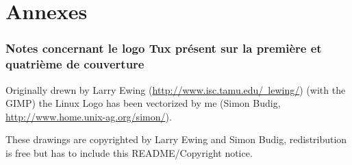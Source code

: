 \documentclass[pdftex,a4paper,titlepage,11pt]{article}
\newcommand{\lastPage}{
	\newpage
	\strut
	\fancyhf{}
	\renewcommand{\headrulewidth}{0pt}
	\addtocounter{page}{-1}
	\AddToShipoutPicture*{\BackgroundPic{Tux_n&b_half_1.png}}
	\newpage
}
\newcommand\BackgroundPic[1]{
	\put(0,-100){
		\parbox[b][\paperheight]{\paperwidth}{
			\vfill
			\centering
			\texttt{[image: \#1]}
			\vfill
		}
	}
}
\begin{document}
\newpage



\printnomenclature[3cm]

\newpage

\section*{Annexes} 

\subsubsection*{Notes concernant le logo Tux présent sur la première et quatrième de couverture}
Originally drewn by Larry Ewing (\href{http://www.isc.tamu.edu/~lewing/}{http://www.isc.tamu.edu/~lewing/}) (with the GIMP) the Linux Logo has been vectorized by me (Simon Budig, \href{http://www.home.unix-ag.org/simon/}{http://www.home.unix-ag.org/simon/}).

These drawings are copyrighted by Larry Ewing and Simon Budig, redistribution is free but has to include this README/Copyright notice.

\lastPage
\end{document}

